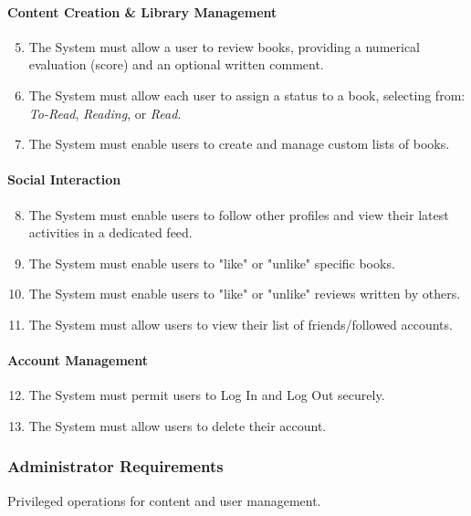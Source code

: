 \paragraph{Content Creation \& Library Management}
\begin{enumerate}
    \setcounter{enumi}{4} 
    \item The System must allow a user to review books, providing a numerical evaluation (score) and an optional written comment.
    \item The System must allow each user to assign a status to a book, selecting from: \textit{To-Read}, \textit{Reading}, or \textit{Read}.
    \item The System must enable users to create and manage custom lists of books.
\end{enumerate}

\paragraph{Social Interaction}
\begin{enumerate}
    \setcounter{enumi}{7} 
    \item The System must enable users to follow other profiles and view their latest activities in a dedicated feed.
    \item The System must enable users to "like" or "unlike" specific books.
    \item The System must enable users to "like" or "unlike" reviews written by others.
    \item The System must allow users to view their list of friends/followed accounts.
\end{enumerate}

\paragraph{Account Management}
\begin{enumerate}
    \setcounter{enumi}{11} 
    \item The System must permit users to Log In and Log Out securely.
    \item The System must allow users to delete their account.
\end{enumerate}

\subsubsection{Administrator Requirements}
Privileged operations for content and user management.

